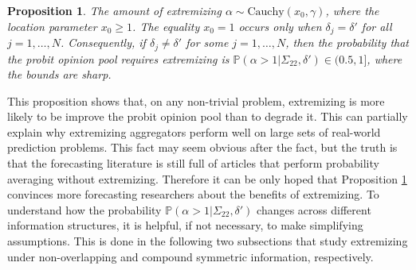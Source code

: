 \documentclass[11pt]{article}
\renewcommand{\P}{\mathbb{P}}
\newtheorem{proposition}[theorem]{Proposition}
\theoremstyle{definition}
\theoremstyle{definition}
\begin{document}
\begin{proposition}
\label{positiveProbThm}
The amount of extremizing $\alpha \sim \text{Cauchy}(x_0, \gamma)$, where the location parameter $x_0 \geq 1$. The equality $x_0 = 1$ occurs only when $\delta_j = \delta'$ for all $j = 1, \dots, N$. Consequently, if $\delta_j \neq \delta'$ for some $j = 1, \dots, N$, then the probability that the probit opinion pool requires extremizing is $\P(\alpha > 1 | \Sigma_{22}, \delta') \in (0.5,1]$, where the bounds are sharp.
\end{proposition}
\noindent
This proposition shows that, on any non-trivial problem, extremizing is more likely to be improve the probit opinion pool than to degrade it. This can partially explain why extremizing aggregators perform well on large sets of real-world prediction problems. This fact may seem obvious after the fact, but the truth is that the forecasting literature is still full of articles that perform probability averaging without extremizing. Therefore it can be only hoped that Proposition \ref{positiveProbThm} convinces more forecasting researchers about the benefits of extremizing. To understand how the probability $\P(\alpha > 1 | \Sigma_{22}, \delta')$  changes across different information structures,  
 it is helpful, if not necessary, to make simplifying assumptions. This is done in the following two subsections that study extremizing under non-overlapping and compound symmetric  information, respectively. 
% 
% 
\end{document}
